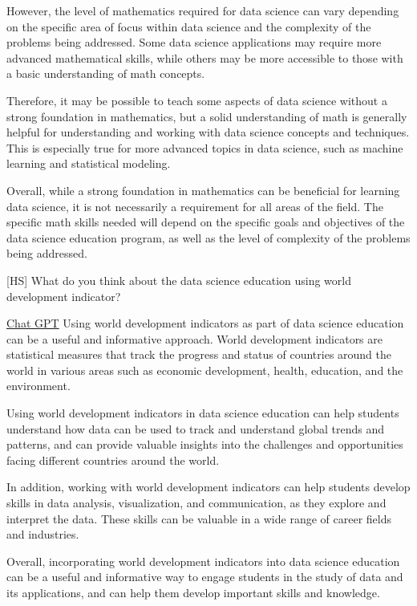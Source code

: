 \documentclass[
]{book}
\theoremstyle{definition}
\theoremstyle{definition}
\theoremstyle{definition}
\theoremstyle{definition}
\theoremstyle{remark}
\begin{document}
However, the level of mathematics required for data science can vary depending on the specific area of focus within data science and the complexity of the problems being addressed. Some data science applications may require more advanced mathematical skills, while others may be more accessible to those with a basic understanding of math concepts.

Therefore, it may be possible to teach some aspects of data science without a strong foundation in mathematics, but a solid understanding of math is generally helpful for understanding and working with data science concepts and techniques. This is especially true for more advanced topics in data science, such as machine learning and statistical modeling.

Overall, while a strong foundation in mathematics can be beneficial for learning data science, it is not necessarily a requirement for all areas of the field. The specific math skills needed will depend on the specific goals and objectives of the data science education program, as well as the level of complexity of the problems being addressed.

{[}HS{]} What do you think about the data science education using world development indicator?

\protect\hyperlink{chatgpt}{Chat GPT} Using world development indicators as part of data science education can be a useful and informative approach. World development indicators are statistical measures that track the progress and status of countries around the world in various areas such as economic development, health, education, and the environment.

Using world development indicators in data science education can help students understand how data can be used to track and understand global trends and patterns, and can provide valuable insights into the challenges and opportunities facing different countries around the world.

In addition, working with world development indicators can help students develop skills in data analysis, visualization, and communication, as they explore and interpret the data. These skills can be valuable in a wide range of career fields and industries.

Overall, incorporating world development indicators into data science education can be a useful and informative way to engage students in the study of data and its applications, and can help them develop important skills and knowledge.
\end{document}
